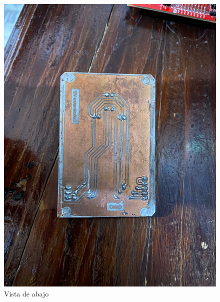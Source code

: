 \documentclass[12pt]{report}
\begin{document}
\begin{enumerate}
\begin{figure}[H]
\begin{minipage}{0.45\textwidth}
      \includegraphics[width=\textwidth]{screenshots/PlacaAbajo.jpeg}
      \caption{Vista de abajo}
      \label{fig:imagen2}
    \end{minipage}
  \end{figure}
\end{enumerate}
\newpage
\end{document}
